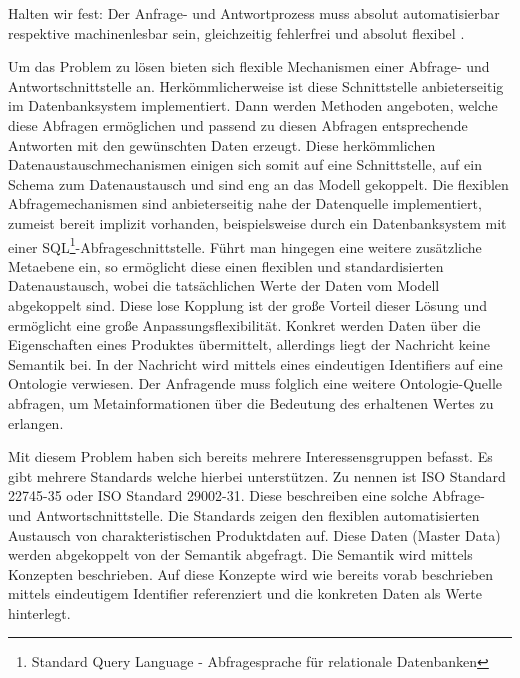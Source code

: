 Halten wir fest: Der Anfrage- und Antwortprozess muss absolut automatisierbar respektive machinenlesbar sein, gleichzeitig fehlerfrei und absolut flexibel \citep[vgl.][]{uiterwykEclass}.


Um das Problem zu lösen bieten sich flexible Mechanismen einer Abfrage- und Antwortschnittstelle an. Herkömmlicherweise ist diese Schnittstelle anbieterseitig im Datenbanksystem implementiert. Dann werden Methoden angeboten, welche diese Abfragen ermöglichen und passend zu diesen Abfragen entsprechende Antworten mit den gewünschten Daten erzeugt. 
Diese herkömmlichen Datenaustauschmechanismen einigen sich somit auf eine Schnittstelle, auf ein Schema zum Datenaustausch und sind eng an das Modell gekoppelt. Die flexiblen Abfragemechanismen sind anbieterseitig nahe der Datenquelle implementiert, zumeist bereit implizit vorhanden, beispielsweise durch ein Datenbanksystem mit einer SQL\footnote{Standard Query Language - Abfragesprache für relationale Datenbanken}-Abfrageschnittstelle. 
Führt man hingegen eine weitere zusätzliche Metaebene ein, so ermöglicht diese einen flexiblen und standardisierten Datenaustausch, wobei die tatsächlichen Werte der Daten vom Modell abgekoppelt sind. Diese lose Kopplung ist der große Vorteil dieser Lösung und ermöglicht eine große Anpassungsflexibilität. Konkret werden Daten über die Eigenschaften eines Produktes übermittelt, allerdings liegt der Nachricht keine Semantik bei. In der Nachricht wird mittels eines eindeutigen Identifiers auf eine Ontologie verwiesen. Der Anfragende muss folglich eine weitere Ontologie-Quelle abfragen, um Metainformationen über die Bedeutung des erhaltenen Wertes zu erlangen. 

Mit diesem Problem haben sich bereits mehrere Interessensgruppen befasst. Es gibt mehrere Standards welche hierbei unterstützen. Zu nennen ist ISO Standard 22745-35 oder ISO Standard 29002-31. Diese beschreiben eine solche Abfrage- und Antwortschnittstelle. Die Standards zeigen den flexiblen automatisierten Austausch von charakteristischen Produktdaten auf. Diese Daten (Master Data) werden abgekoppelt von der Semantik abgefragt. Die Semantik wird mittels Konzepten beschrieben. Auf diese Konzepte wird wie bereits vorab beschrieben mittels eindeutigem Identifier referenziert und die konkreten Daten als Werte hinterlegt.  

